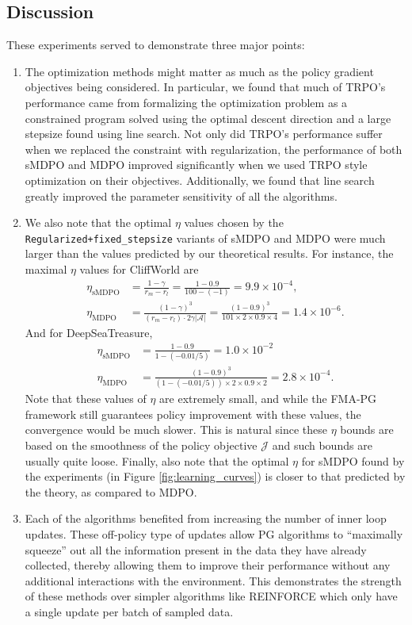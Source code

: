 \documentclass[a4paper, 10pt]{article}
\begin{document}
\subsection{Discussion} \label{app:tabular_discussion}
These experiments served to demonstrate three major points:
\begin{enumerate}
\item The optimization methods might matter as much as the policy gradient objectives being considered. In particular, we found that much of TRPO's performance came from formalizing the optimization problem as a constrained program solved using the optimal descent direction and a large stepsize found using line search. Not only did TRPO's performance suffer when we replaced the constraint with regularization, the performance of both sMDPO and MDPO improved significantly when we used TRPO style optimization on their objectives. Additionally, we found that line search greatly improved the parameter sensitivity of all the algorithms.
\item We also note that the optimal $\eta$ values chosen by the \texttt{Regularized+fixed_stepsize} variants of sMDPO and MDPO were much larger than the values predicted by our theoretical results. For instance, the maximal $\eta$ values for CliffWorld are 
\begin{align*}
\eta_{\text{sMDPO}} &= \frac{1 - \gamma}{r_m - r_l} = \frac{1 - 0.9}{100 - (-1)} = 9.9 \times 10^{-4}, \\
\eta_{\text{MDPO}} &= \frac{(1 - \gamma)^{3}}{(r_m - r_l) \cdot 2\gamma |\mathcal{A}|} = \frac{(1 - 0.9)^{3}}{101 \times 2 \times 0.9 \times 4} = 1.4 \times 10^{-6}.
\end{align*}
And for DeepSeaTreasure, 
\begin{align*}
\eta_{\text{sMDPO}} &= \frac{1 - 0.9}{1 - (-0.01 / 5)} = 1.0 \times 10^{-2} \\
\eta_{\text{MDPO}} &= \frac{(1 - 0.9)^{3}}{(1 - (-0.01 / 5)) \times 2 \times 0.9 \times 2} = 2.8 \times 10^{-4}.
\end{align*}
Note that these values of $\eta$ are extremely small, and while the FMA-PG framework still guarantees policy improvement with these values, the convergence would be much slower. This is natural since these $\eta$ bounds are based on the smoothness of the policy objective $\mathcal{J}$ and such bounds are usually quite loose. Finally, also note that the optimal $\eta$ for sMDPO found by the experiments (in Figure \ref{fig:learning_curves}) is closer to that predicted by the theory, as compared to MDPO.
\item Each of the algorithms benefited from increasing the number of inner loop updates. These off-policy type of updates allow PG algorithms to ``maximally squeeze'' out all the information present in the data they have already collected, thereby allowing them to improve their performance without any additional interactions with the environment. This demonstrates the strength of these methods over simpler algorithms like REINFORCE \citep{williams1992simple} which only have a single update per batch of sampled data. 
\end{enumerate}
\end{document}
